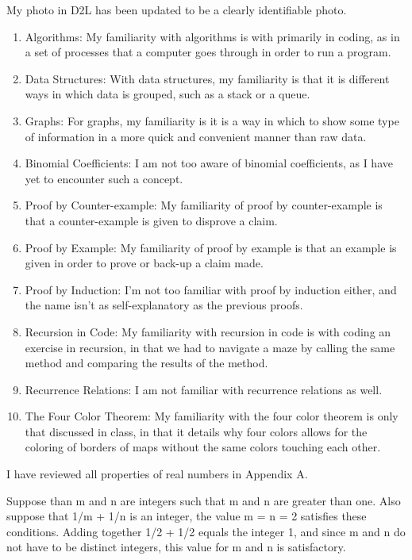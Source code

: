 \documentclass{article}
\author{Joshua Harthan}
\begin{document}
My photo in D2L has been updated to be a clearly identifiable photo.


\clearpage
\header

\begin{enumerate}[(1)]
    \item Algorithms: My familiarity with algorithms is with primarily in coding, as in a set of processes that a computer goes through in order to run a program.
    \item Data Structures: With data structures, my familiarity is that it is different ways in which data is grouped, such as a stack or a queue. 
    \item Graphs: For graphs, my familiarity is it is a way in which to show some type of information in a more quick and convenient manner than raw data.
    \item Binomial Coefficients: I am not too aware of binomial coefficients, as I have yet to encounter such a concept.
    \item Proof by Counter-example: My familiarity of proof by counter-example is that a counter-example is given to disprove a claim.
    \item Proof by Example: My familiarity of proof by example is that an example is given in order to prove or back-up a claim made.
    \item Proof by Induction: I'm not too familiar with proof by induction either, and the name isn't as self-explanatory as the previous proofs.
    \item Recursion in Code: My familiarity with recursion in code is with coding an exercise in recursion, in that we had to navigate a maze by calling the same method and comparing the results of the method.
    \item Recurrence Relations: I am not familiar with recurrence relations as well.
    \item The Four Color Theorem: My familiarity with the four color theorem is only that discussed in class, in that it details why four colors allows for the coloring of borders of maps without the same colors touching each other.
\end {enumerate}

\clearpage
\header
 I have reviewed all properties of real numbers in Appendix A.


\clearpage
\header
Suppose than m and n are integers such that m and n are greater than one. Also suppose that 1/m + 1/n is an integer, the value m = n = 2 satisfies these conditions. Adding together 1/2 + 1/2 equals the integer 1, and since m and n do not have to be distinct integers, this value for m and n is satisfactory.
\end{document}
